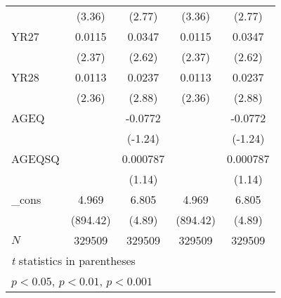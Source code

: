 {\begin{tabular}{l*{4}{c}}
            &      (3.36)         &      (2.77)         &      (3.36)         &      (2.77)         \\
[1em]
YR27        &      0.0115\sym{*}  &      0.0347\sym{**} &      0.0115\sym{*}  &      0.0347\sym{**} \\
            &      (2.37)         &      (2.62)         &      (2.37)         &      (2.62)         \\
[1em]
YR28        &      0.0113\sym{*}  &      0.0237\sym{**} &      0.0113\sym{*}  &      0.0237\sym{**} \\
            &      (2.36)         &      (2.88)         &      (2.36)         &      (2.88)         \\
[1em]
AGEQ        &                     &     -0.0772         &                     &     -0.0772         \\
            &                     &     (-1.24)         &                     &     (-1.24)         \\
[1em]
AGEQSQ      &                     &    0.000787         &                     &    0.000787         \\
            &                     &      (1.14)         &                     &      (1.14)         \\
[1em]
\_cons      &       4.969\sym{***}&       6.805\sym{***}&       4.969\sym{***}&       6.805\sym{***}\\
            &    (894.42)         &      (4.89)         &    (894.42)         &      (4.89)         \\
\hline
\(N\)       &      329509         &      329509         &      329509         &      329509         \\
\hline\hline
\multicolumn{5}{l}{\footnotesize \textit{t} statistics in parentheses}\\
\multicolumn{5}{l}{\footnotesize \sym{*} \(p<0.05\), \sym{**} \(p<0.01\), \sym{***} \(p<0.001\)}\\
\end{tabular}
}
